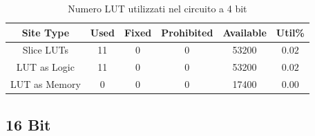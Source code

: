 \begin{table}[ht]
      \centering
      \begin{tabular}{|c|c|c|c|c|c|}
        \hline
        Site Type & Used & Fixed & Prohibited & Available & Util\% \\ \hline
        Slice LUTs & 11 & 0 & 0 & 53200 & $0.02$ \\ \hline
         LUT as Logic & 11 & 0 & 0 & 53200 & $0.02$ \\ \hline 
         LUT as Memory  & 0 & 0 & 0 & 17400 & $0.00$ \\ \hline
      \end{tabular}
      \caption{Numero LUT utilizzati nel circuito a 4 bit}
      \label{lut_utilization_8bit}
\end{table}
\FloatBarrier

\subsection{16 Bit}


